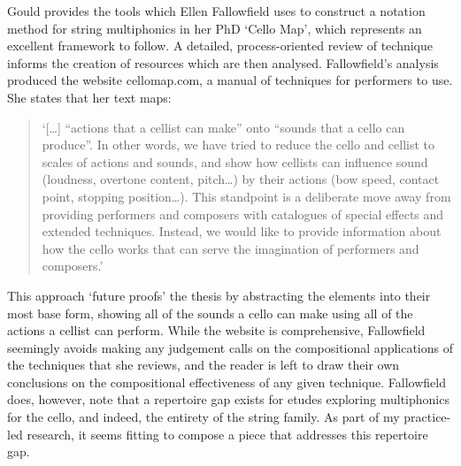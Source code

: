 Gould provides the tools which Ellen Fallowfield uses to construct a notation method for string multiphonics in her PhD ‘Cello Map’, which represents an excellent framework to follow. A detailed, process-oriented review of technique informs the creation of resources which are then analysed.\autocite{fallowfieldCelloMapHandbook2009} Fallowfield’s analysis produced the website cellomap.com, a manual of techniques for performers to use. She states that her text maps:
\begin{quotation}
    ‘[\ldots] “actions that a cellist can make” onto “sounds that a cello can produce”. In other words, we have tried to reduce the cello and cellist to scales of actions and sounds, and show how cellists can influence sound (loudness, overtone content, pitch…) by their actions (bow speed, contact point, stopping position…). This standpoint is a deliberate move away from providing performers and composers with catalogues of special effects and extended techniques. Instead, we would like to provide information about how the cello works that can serve the imagination of performers and composers.’\autocite{fallowfieldCelloMap}
\end{quotation}
This approach ‘future proofs’ the thesis by abstracting the elements into their most base form, showing all of the sounds a cello can make using all of the actions a cellist can perform. While the website is comprehensive, Fallowfield seemingly avoids making any judgement calls on the compositional applications of the techniques that she reviews, and the reader is left to draw their own conclusions on the compositional effectiveness of any given technique. Fallowfield does, however, note that a repertoire gap exists for etudes exploring multiphonics for the cello, and indeed, the entirety of the string family. As part of my practice-led research, it seems fitting to compose a piece that addresses this repertoire gap.

